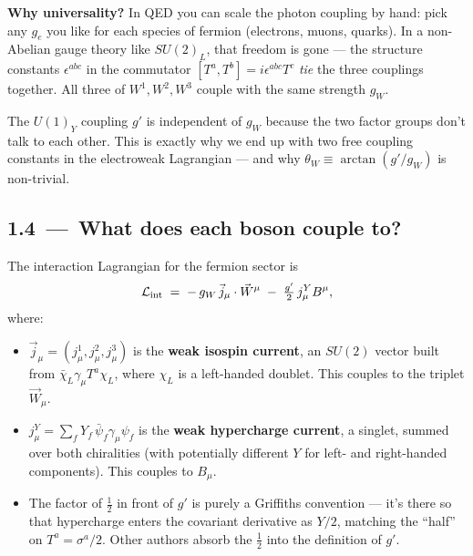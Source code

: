 \documentclass[11pt]{article}
\begin{document}
\begin{intuitionbox}
\textbf{Why universality?} In QED you can scale the photon coupling by hand: pick any $g_e$
you like for each species of fermion (electrons, muons, quarks). In a non-Abelian gauge
theory like $SU(2)_L$, that freedom is gone --- the structure constants $\epsilon^{abc}$ in
the commutator $[T^a, T^b] = i\epsilon^{abc} T^c$ \emph{tie} the three couplings together.
All three of $W^1, W^2, W^3$ couple with the same strength $g_W$.

The $U(1)_Y$ coupling $g'$ is independent of $g_W$ because the two factor groups don't talk
to each other. This is exactly why we end up with two free coupling constants in the
electroweak Lagrangian --- and why $\theta_W \equiv \arctan(g'/g_W)$ is non-trivial.
\end{intuitionbox}

\subsection*{1.4 \,---\, What does each boson couple to?}

\begin{conceptbox}
The interaction Lagrangian for the fermion sector is
\begin{equation}
\mathcal{L}_{\rm int} \;=\; -\, g_W \,\vec{j}_\mu \cdot \vec{W}^\mu \;-\; \tfrac{g'}{2}\, j^Y_\mu B^\mu ,
\label{eq:Lint}
\end{equation}
where:
\begin{itemize}[leftmargin=*]
  \item $\vec{j}_\mu = (j^1_\mu, j^2_\mu, j^3_\mu)$ is the \textbf{weak isospin current},
        an $SU(2)$ vector built from $\bar\chi_L \gamma_\mu T^a \chi_L$, where $\chi_L$ is a
        left-handed doublet. This couples to the triplet $\vec{W}_\mu$.
  \item $j^Y_\mu = \sum_f Y_f \,\bar\psi_f \gamma_\mu \psi_f$ is the \textbf{weak hypercharge
        current}, a singlet, summed over both chiralities (with potentially different $Y$
        for left- and right-handed components). This couples to $B_\mu$.
  \item The factor of $\tfrac{1}{2}$ in front of $g'$ is purely a Griffiths convention ---
        it's there so that hypercharge enters the covariant derivative as $Y/2$, matching
        the ``half'' on $T^a = \sigma^a/2$. Other authors absorb the $\tfrac{1}{2}$ into the
        definition of $g'$.
\end{itemize}
\end{conceptbox}
\end{document}
